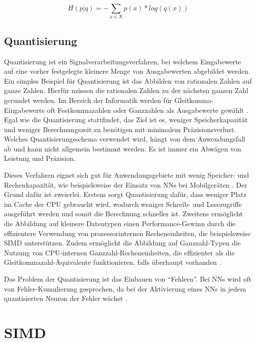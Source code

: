 \begin{equation}
  H(p|q) = -\sum_{x \in X} p(x) * log(q(x))
  \label{equation:crossentropy}
\end{equation}


\subsection{Quantisierung}

Quantisierung ist ein Signalverarbeitungsverfahren, bei welchem Eingabewerte auf eine vorher festgelegte kleinere Menge von Ausgabewerten abgebildet werden. Ein simples Beispiel für Quantisierung ist das Abbilden von rationalen Zahlen auf ganze Zahlen. Hierfür müssen die rationalen Zahlen zu der nächsten ganzen Zahl gerundet werden. Im Bereich der Informatik werden für Gleitkomma-Eingabewerte oft Festkommazahlen oder Ganzzahlen als Ausgabewerte gewählt \cite{Gysel2016}. Egal wie die Quantisierung stattfindet, das Ziel ist es, weniger Speicherkapazität und weniger Berechnungszeit zu benötigen mit minimalem Präzisionsverlust. Welches Quantisierungsschema verwendet wird, hängt von dem Anwendungsfall ab und kann nicht allgemein bestimmt werden. Es ist immer ein Abwägen von Leistung und Präzision.

Dieses Verfahren eignet sich gut für Anwendungsgebiete mit wenig Speicher- und Rechenkapazität, wie beispielsweise der Einsatz von \acp{NN} bei Mobilgeräten \cite{MaQuantization2019, Gysel2016}. Der Grund dafür ist zweierlei. Erstens sorgt Quantisierung dafür, dass weniger Platz im Cache der CPU gebraucht wird, wodurch weniger Schreib- und Lesezugriffe ausgeführt werden und somit die Berechnung schneller ist. Zweitens ermöglicht die Abbildung auf kleinere Datentypen einen Performance-Gewinn durch die effizientere Verwendung von prozessorinternen Recheneinheiten, die beispielsweise \ac{SIMD} unterstützen. Zudem ermöglicht die Abbildung auf Ganzzahl-Typen die Nutzung von CPU-internen Ganzzahl-Recheneinheiten, die effizienter als die Gleitkommazahl-Äquivalente funktionieren, falls überhaupt vorhanden \cite{Jacob2017}.

Das Problem der Quantisierung ist das Einbauen von \enquote{Fehlern}. Bei \acp{NN} wird oft von Fehler-Kumulierung gesprochen, da bei der Aktivierung eines \acp{NN} in jedem quantisierten Neuron der Fehler wächst \cite{Park2018}.

\section{SIMD}

